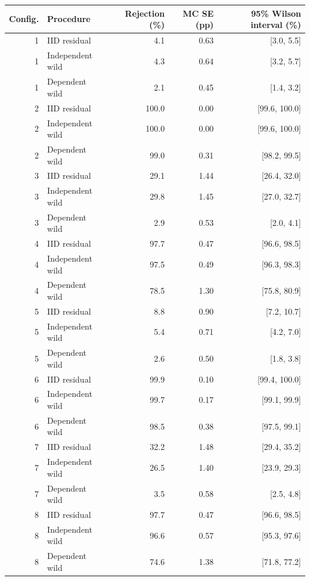 \begin{tabular}{rlrrr}
\toprule
Config. & Procedure & Rejection (\%) & MC SE (pp) & 95\% Wilson interval (\%) \\
\midrule
1 & IID residual & 4.1 & 0.63 & [3.0, 5.5] \\
1 & Independent wild & 4.3 & 0.64 & [3.2, 5.7] \\
1 & Dependent wild & 2.1 & 0.45 & [1.4, 3.2] \\
2 & IID residual & 100.0 & 0.00 & [99.6, 100.0] \\
2 & Independent wild & 100.0 & 0.00 & [99.6, 100.0] \\
2 & Dependent wild & 99.0 & 0.31 & [98.2, 99.5] \\
3 & IID residual & 29.1 & 1.44 & [26.4, 32.0] \\
3 & Independent wild & 29.8 & 1.45 & [27.0, 32.7] \\
3 & Dependent wild & 2.9 & 0.53 & [2.0, 4.1] \\
4 & IID residual & 97.7 & 0.47 & [96.6, 98.5] \\
4 & Independent wild & 97.5 & 0.49 & [96.3, 98.3] \\
4 & Dependent wild & 78.5 & 1.30 & [75.8, 80.9] \\
5 & IID residual & 8.8 & 0.90 & [7.2, 10.7] \\
5 & Independent wild & 5.4 & 0.71 & [4.2, 7.0] \\
5 & Dependent wild & 2.6 & 0.50 & [1.8, 3.8] \\
6 & IID residual & 99.9 & 0.10 & [99.4, 100.0] \\
6 & Independent wild & 99.7 & 0.17 & [99.1, 99.9] \\
6 & Dependent wild & 98.5 & 0.38 & [97.5, 99.1] \\
7 & IID residual & 32.2 & 1.48 & [29.4, 35.2] \\
7 & Independent wild & 26.5 & 1.40 & [23.9, 29.3] \\
7 & Dependent wild & 3.5 & 0.58 & [2.5, 4.8] \\
8 & IID residual & 97.7 & 0.47 & [96.6, 98.5] \\
8 & Independent wild & 96.6 & 0.57 & [95.3, 97.6] \\
8 & Dependent wild & 74.6 & 1.38 & [71.8, 77.2] \\
\bottomrule
\end{tabular}
